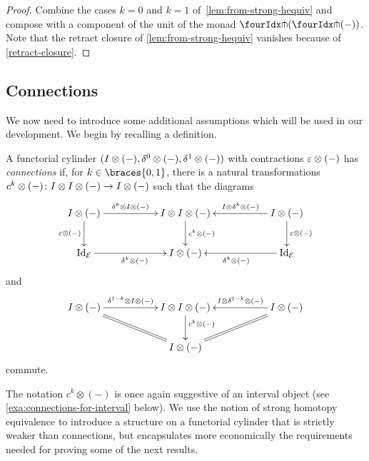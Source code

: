 \documentclass[reqno,10pt,a4paper,oneside,draft]{amsart}
\begin{document}
\begin{proof} Combine the cases $k = 0$ and $k = 1$ of~\cref{lem:from-strong-hequiv} and compose
with  a component of the unit of the monad $\liftl{(\liftr{(-)})}$.  Note that the retract closure of \cref{lem:from-strong-hequiv} vanishes because of \cref{retract-closure}.
\end{proof} 


\subsection*{Connections} We now need to introduce some additional assumptions
which will be used in our development. We begin by recalling a definition.

\begin{definition} \label{def:connections}
A functorial cylinder $(I \otimes (-), \delta^0 \otimes (-), \delta^1 \otimes (-))$ with contractions $\varepsilon \otimes (-)$ has \emph{connections} if, for $k \in \braces{0, 1}$, there is a natural transformations $c^k \otimes (-) \colon I \otimes I \otimes (-) \to I \otimes (-)$ such that the diagrams
\begin{equation} \label{connections:0}
\xymatrix@C+3em{
  \interval \otimes (-)
  \ar[r]^-{\kcyl \otimes \interval \otimes (-)}
  \ar[d]_{\ccyl \otimes (-)}
&
  \interval \otimes \interval \otimes (-)
  \ar[d]^{c^k \otimes (-)}
&
  \interval \otimes (-)
  \ar[l]_-{\interval \otimes \kcyl \otimes (-)}
  \ar[d]^{\ccyl \otimes (-)}
\\
  \Id_\catE
  \ar[r]_{\kcyl \otimes (-)}
&
  \interval \otimes (-)
&
  \Id_\catE
  \ar[l]^{\kcyl \otimes (-)}
}
\end{equation}
and
\begin{equation} \label{connections:1}
\xymatrix@C+3em{
  \interval \otimes (-)
  \ar[r]^-{\kcylinv \otimes \interval \otimes (-)}
  \ar@{=}[dr]
&
  \interval \otimes \interval \otimes (-)
  \ar[d]^(0.4){c^k \otimes (-)}
&
  \interval \otimes (-)
  \ar[l]_-{\interval \otimes \kcylinv \otimes (-)}
  \ar@{=}[dl]
\\&
  \interval \otimes (-)
}
\end{equation}
commute.
\end{definition}

The notation $c^k \otimes (-)$ is once again suggestive of an interval object (see \cref{exa:connections-for-interval} below).
We use the notion of strong homotopy equivalence to introduce a structure on a functorial cylinder that is strictly weaker than connections, but encapsulates more economically the requirements needed for proving some of the next results.
\end{document}
